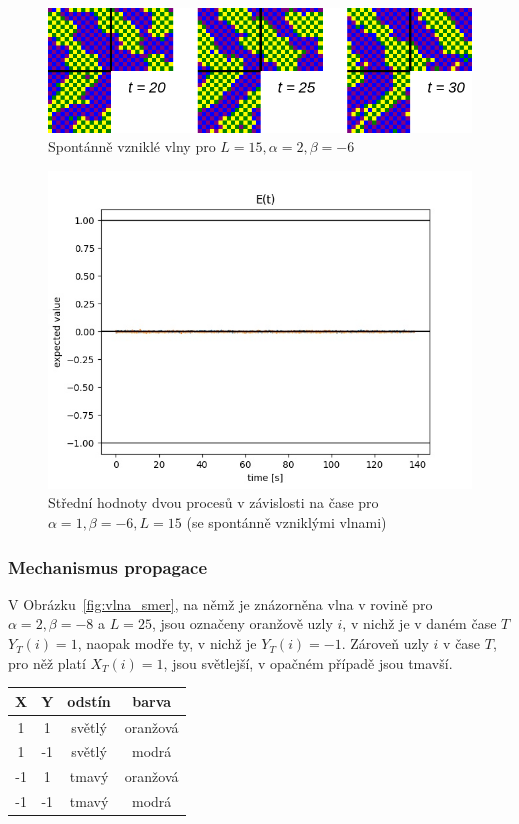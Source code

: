 \documentclass{article}
\begin{document}
\begin{figure}[H]
 \includegraphics[scale=0.5]{spontaneous_waves}
 \caption{Spontánně vzniklé vlny pro $L = 15, \alpha = 2, \beta = -6$}
\end{figure}

\begin{figure}[H]
    \includegraphics[scale=0.8]{spontaneous_waves_graph}
    \caption{Střední hodnoty dvou procesů v závislosti na čase pro $\alpha = 1, \beta = -6, L = 15$ (se spontánně vzniklými vlnami)}
\end{figure}

\subsubsection{Mechanismus propagace}
V Obrázku~\ref{fig:vlna_smer}, na němž je znázorněna vlna v rovině pro $\alpha = 2, \beta = -8$ a $L = 25$, jsou označeny oranžově uzly $i$, v nichž je v daném čase $T$ $Y_T(i) = 1$, naopak modře ty, v nichž je $Y_T(i) = -1$. Zároveň uzly $i$ v čase $T$, pro něž platí $X_T(i) = 1$, jsou světlejší, v opačném případě jsou tmavší.

\begin{center}
\begin{tabular}{ c|c|c|c }
 \textbf{X} & \textbf{Y} & \textbf{odstín} & \textbf{barva} \\ 
\hline
 1 & 1 & světlý & oranžová  \\  
 1 & -1 & světlý & modrá \\   
 -1 & 1 & tmavý & oranžová  \\  
 -1 & -1 & tmavý & modrá
\end{tabular}
\end{center}
\end{document}
